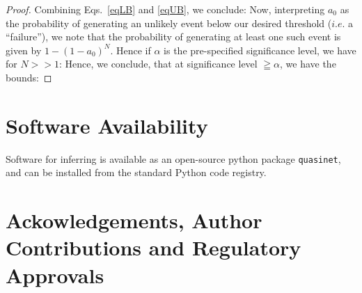 \documentclass[onecolumn,10pt]{IEEEtran}
\begin{document}
\begin{proof}
  Combining Eqs.~\ref{eqLB} and \ref{eqUB}, we conclude:
  Now, interpreting $a_0$ as the probability of generating an unlikely event below our desired threshold ($i.e.$ a ``failure''), we note that the probability of generating at least one such event is given by $1-(1-a_0)^N$. Hence if $\alpha$ is the pre-specified significance level, we have for $N >> 1 $:
  Hence, we conclude, that at significance level $\geqq \alpha$, we have the bounds:
\end{proof}




 

\section*{Software Availability}
Software for inferring  is available as an open-source python package \texttt{quasinet}, and can be
installed from the standard Python code registry.


\section*{Ackowledgements, Author Contributions and Regulatory Approvals}
\end{document}
